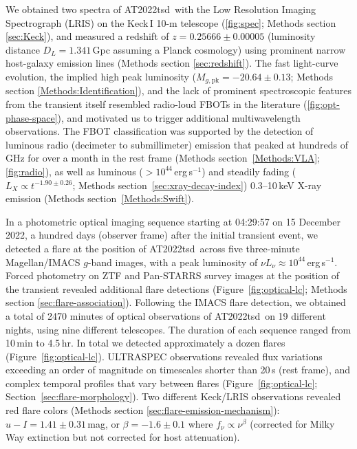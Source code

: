 \documentclass{nature_plusfigure}
\newcommand{\at}{AT2022tsd}
\begin{document}
We obtained two spectra of \at\ with the Low Resolution Imaging Spectrograph (LRIS\cite{Oke1995}) on the Keck\,I 10-m telescope (\ref{fig:spec}; Methods section \ref{sec:Keck}), and measured\cite{Ho2022_Astronote_Keck} a redshift of $z=0.25666\pm0.00005$ (luminosity distance $D_L=1.341\,$Gpc assuming a Planck cosmology\cite{Planck2020}) using prominent narrow host-galaxy emission lines (Methods section \ref{sec:redshift}). 
The fast light-curve evolution, the implied high peak luminosity ($M_{g,\mathrm{pk}}=-20.64\pm0.13$; Methods section \ref{Methods:Identification}), and the lack of prominent spectroscopic features from the transient itself resembled radio-loud FBOTs in the literature\cite{Prentice2018,Ho2020_Koala,Perley2019,Perley2021,Yao2022} (\ref{fig:opt-phase-space}), and motivated us to trigger additional multiwavelength observations.
The FBOT classification was supported by the detection of luminous radio (decimeter\cite{Ho2022Astronote_radio} to submillimeter) emission that peaked at hundreds of GHz for over a month in the rest frame (Methods section~\ref{Methods:VLA}; \ref{fig:radio}),
as well as luminous ($>10^{44}\,$erg\,s$^{-1}$) and steadily fading ($L_X\propto t^{-1.90\pm0.26}$; Methods section~\ref{sec:xray-decay-index}) 0.3--10\,keV X-ray emission\cite{Schulze2022Astronote_xray} (Methods section~\ref{Methods:Swift}).

In a photometric optical imaging sequence starting at 04:29:57 on 15 December 2022, a hundred days (observer frame) after the initial transient event, we detected\cite{Ho2022_Astronote_Flares} a flare at the position of \at\ across five three-minute Magellan/IMACS $g$-band images, with a peak luminosity of $\nu L_\nu \approx 10^{44}\,$erg\,s$^{-1}$.
Forced photometry on ZTF and Pan-STARRS survey images at the position of the transient revealed additional flare detections (Figure~\ref{fig:optical-lc}; Methods section \ref{sec:flare-association}).
Following the IMACS flare detection, we obtained a total of 2470 minutes of optical observations of \at\ on 19 different nights, using nine different telescopes. The duration of each sequence ranged from 10\,min to 4.5\,hr. In total we detected approximately a dozen flares (Figure~\ref{fig:optical-lc}). ULTRASPEC observations revealed flux variations exceeding an order of magnitude on timescales shorter than 20\,s (rest frame), and complex temporal profiles that vary between flares (Figure~\ref{fig:optical-lc}; Section~\ref{sec:flare-morphology}).
Two different Keck/LRIS observations revealed red flare colors (Methods section \ref{sec:flare-emission-mechanism}):
$u-I=1.41\pm0.31\,$mag, or $\beta=-1.6\pm0.1$ where
$f_\nu \propto \nu^{\beta}$ (corrected for Milky Way extinction but not corrected for host attenuation).
\end{document}
